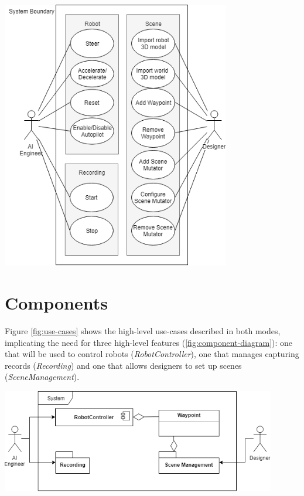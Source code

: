 \begin{center}
\noindent\includegraphics[width=10cm]{tex/img/ch04/Use_Cases_05.png}
\label{fig:use-cases}
\end{center}

\section{Components}
Figure \ref{fig:use-cases} shows the high-level use-cases described in both modes, implicating the need for three high-level features (\ref{fig:component-diagram}): one that will be used to control robots (\textit{RobotController}), one that manages capturing records (\textit{Recording}) and one that allows designers to set up scenes (\textit{SceneManagement}).

\begin{center}
\noindent\includegraphics[width=12cm]{tex/img/ch04/ComponentDiagram01.png}
\label{fig:component-diagram}
\end{center}

